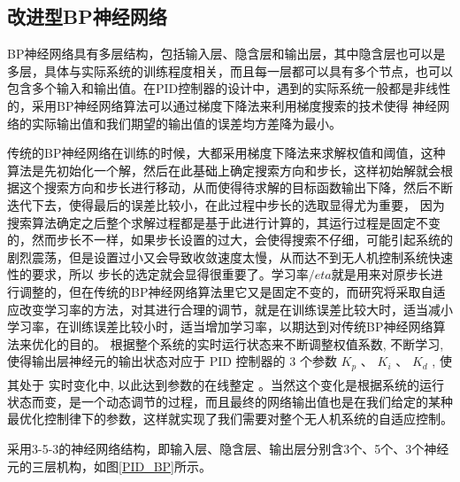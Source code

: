 \documentclass[UTF8,a4paper,10pt,nocolorlinks]{ctexart}
\newcommand{\upcite}[1]{\textsuperscript{\textsuperscript{\cite{#1}}}}
\begin{document}
    \subsection{改进型BP神经网络}
    BP神经网络具有多层结构，包括输入层、隐含层和输出层，其中隐含层也可以是多层，具体与实际系统的训练程度相关，而且每一层都可以具有多个节点，也可以包含多个输入和输出值。在PID控制器的设计中，遇到的实际系统一般都是非线性的，采用BP神经网络算法可以通过梯度下降法来利用梯度搜索的技术使得
    神经网络的实际输出值和我们期望的输出值的误差均方差降为最小。
    \par 传统的BP神经网络在训练的时候，大都采用梯度下降法来求解权值和阈值，这种算法是先初始化一个解，然后在此基础上确定搜索方向和步长，这样初始解就会根据这个搜索方向和步长进行移动，从而使得待求解的目标函数输出下降，然后不断迭代下去，使得最后的误差比较小，在此过程中步长的选取显得尤为重要，
    因为搜索算法确定之后整个求解过程都是基于此进行计算的，其运行过程是固定不变的，然而步长不一样，如果步长设置的过大，会使得搜索不仔细，可能引起系统的剧烈震荡，但是设置过小又会导致收敛速度太慢，从而达不到无人机控制系统快速性的要求，所以
    步长的选定就会显得很重要了。学习率$/eta$就是用来对原步长进行调整的，但在传统的BP神经网络算法里它又是固定不变的，而研究将采取自适应改变学习率的方法，对其进行合理的调节，就是在训练误差比较大时，适当减小学习率，在训练误差比较小时，适当增加学习率，以期达到对传统BP神经网络算法来优化的目的。
    根据整个系统的实时运行状态来不断调整权值系数, 不断学习, 使得输出层神经元的输出状态对应于 PID 控制器的 3 个参数 $K_{p}$ 、 $K_{i}$ 、 $K_{d}$ , 使其处于
    实时变化中, 以此达到参数的在线整定 \upcite{6} 。当然这个变化是根据系统的运行状态而变，是一个动态调节的过程，而且最终的网络输出值也是在我们给定的某种最优化控制律下的参数，这样就实现了我们需要对整个无人机系统的自适应控制。
    \par 采用3-5-3的神经网络结构，即输入层、隐含层、输出层分别含3个、5个、3个神经元的三层机构，如图\ref{PID_BP}所示。
\end{document}

